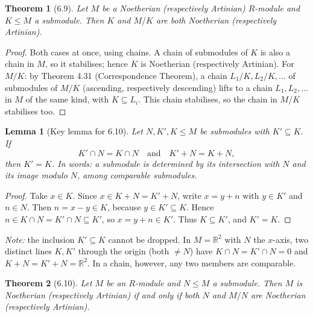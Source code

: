 \documentclass[12pt]{article}
\newtheorem{theorem}{Theorem}
\newtheorem{lemma}{Lemma}
\begin{document}
\begin{theorem}[6.9]
Let $M$ be a Noetherian (respectively Artinian) $R$-module and $K \leq M$ a submodule. Then $K$ and $M/K$ are both Noetherian (respectively Artinian).
\end{theorem}

\begin{proof}
Both cases at once, using chains. A chain of submodules of $K$ is also a chain in $M$, so it stabilises; hence $K$ is Noetherian (respectively Artinian). For $M/K$: by Theorem 4.31 (Correspondence Theorem), a chain $L_1/K, L_2/K, \ldots$ of submodules of $M/K$ (ascending, respectively descending) lifts to a chain $L_1, L_2, \ldots$ in $M$ of the same kind, with $K \subseteq L_i$. This chain stabilises, so the chain in $M/K$ stabilises too.
\end{proof}

\begin{lemma}[Key lemma for 6.10]
Let $N, K', K \leq M$ be submodules with $K' \subseteq K$. If
\[
  K' \cap N = K \cap N \quad \text{and} \quad K' + N = K + N,
\]
then $K' = K$. In words: a submodule is determined by its intersection with $N$ and its image modulo $N$, among comparable submodules.
\end{lemma}

\begin{proof}
Take $x \in K$. Since $x \in K + N = K' + N$, write $x = y + n$ with $y \in K'$ and $n \in N$. Then $n = x - y \in K$, because $y \in K' \subseteq K$. Hence $n \in K \cap N = K' \cap N \subseteq K'$, so $x = y + n \in K'$. Thus $K \subseteq K'$, and $K' = K$.
\end{proof}

\noindent\textit{Note:} the inclusion $K' \subseteq K$ cannot be dropped. In $M = \mathbb{R}^2$ with $N$ the $x$-axis, two distinct lines $K, K'$ through the origin (both $\neq N$) have $K \cap N = K' \cap N = 0$ and $K + N = K' + N = \mathbb{R}^2$. In a chain, however, any two members are comparable.

\begin{theorem}[6.10]
Let $M$ be an $R$-module and $N \leq M$ a submodule. Then $M$ is Noetherian (respectively Artinian) if and only if both $N$ and $M/N$ are Noetherian (respectively Artinian).
\end{theorem}
\end{document}
